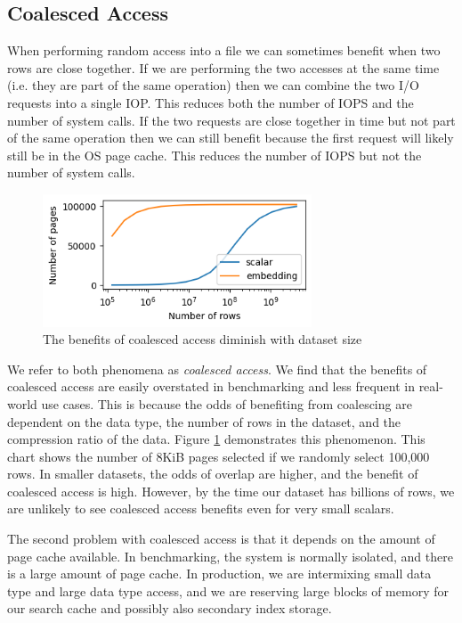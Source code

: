 \documentclass[sigconf, nonacm]{acmart}
\begin{document}
\subsection{Coalesced Access}

When performing random access into a file we can sometimes benefit when two rows are close together.  If we are performing the two accesses at the same time (i.e. they are part of the same operation) then we can combine the two I/O requests into a single IOP.  This reduces both the number of IOPS and the number of system calls.  If the two requests are close together in time but not part of the same operation then we can still benefit because the first request will likely still be in the OS page cache.  This reduces the number of IOPS but not the number of system calls.

\begin{figure}[h]
    \centering
    \includegraphics[width=8cm]{figures/coalesce.png}
    \caption{The benefits of coalesced access diminish with dataset size}
    \label{fig:coalesce}
\end{figure}

We refer to both phenomena as \textit{coalesced access}.  We find that the benefits of coalesced access are easily overstated in benchmarking and less frequent in real-world use cases.  This is because the odds of benefiting from coalescing are dependent on the data type, the number of rows in the dataset, and the compression ratio of the data.  Figure \ref{fig:coalesce} demonstrates this phenomenon.  This chart shows the number of 8KiB pages selected if we randomly select 100,000 rows.  In smaller datasets, the odds of overlap are higher, and the benefit of coalesced access is high.  However, by the time our dataset has billions of rows, we are unlikely to see coalesced access benefits even for very small scalars.

The second problem with coalesced access is that it depends on the amount of page cache available.  In benchmarking, the system is normally isolated, and there is a large amount of page cache.  In production, we are intermixing small data type and large data type access, and we are reserving large blocks of memory for our search cache and possibly also secondary index storage.
\end{document}
